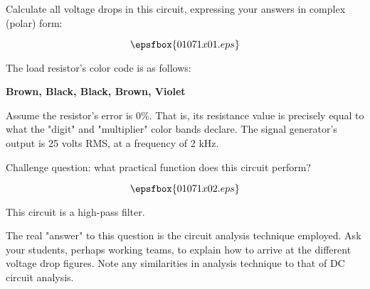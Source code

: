 

Calculate all voltage drops in this circuit, expressing your answers in complex (polar) form:

$$\epsfbox{01071x01.eps}$$

The load resistor's color code is as follows:

\vskip 10pt

{\bf Brown, Black, Black, Brown, Violet}

\vskip 10pt

Assume the resistor's error is 0\%.  That is, its resistance value is precisely equal to what the "digit" and "multiplier" color bands declare.  The signal generator's output is 25 volts RMS, at a frequency of 2 kHz.

\vskip 10pt

Challenge question: what practical function does this circuit perform?







$$\epsfbox{01071x02.eps}$$

\vskip 10pt

This circuit is a high-pass filter.







The real "answer" to this question is the circuit analysis technique employed.  Ask your students, perhaps working teams, to explain how to arrive at the different voltage drop figures.  Note any similarities in analysis technique to that of DC circuit analysis.



